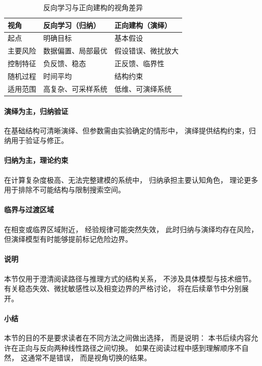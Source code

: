 \documentclass[../main.tex]{subfiles}
\begin{document}
{{{{{{{\begin{table}[h]
	\centering
	\caption{反向学习与正向建构的视角差异}
	\begin{tabular}{lll}
		\toprule
		视角 & 反向学习（归纳） & 正向建构（演绎） \\
		\midrule
		起点 & 明确目标 & 基本假设 \\
		主要风险 & 数据偏置、局部最优 & 假设错误、微扰放大 \\
		控制特征 & 负反馈、稳态 & 正反馈、临界性 \\
		随机过程 & 时间平均 & 结构约束 \\
		适用范围 & 高复杂、可采样系统 & 低维、可演绎系统 \\
		\bottomrule
	\end{tabular}
\end{table}


\paragraph{演绎为主，归纳验证}
在基础结构可清晰演绎、但参数需由实验确定的情形中，
演绎提供结构约束，归纳用于验证与修正。

\paragraph{归纳为主，理论约束}
在计算复杂度极高、无法完整建模的系统中，
归纳承担主要认知角色，
理论更多用于排除不可能结构与限制搜索空间。

\paragraph{临界与过渡区域}
在相变或临界区域附近，
经验规律可能突然失效，
此时归纳与演绎均存在风险，
但演绎模型有时能够提前标记危险边界。

\paragraph{说明}
本节仅用于澄清阅读路径与推理方式的结构关系，
不涉及具体模型与技术细节。
有关稳态失效、微扰敏感性以及相变边界的严格讨论，
将在后续章节中分别展开。


\paragraph{小结}
本节的目的不是要求读者在不同方法之间做出选择，
而是说明：
本书后续内容允许在正向与反向两种线性路径之间切换。
如果在阅读过程中感到理解顺序不自然，
这通常不是错误，
而是视角切换的结果。


}}}}}}}
\end{document}
